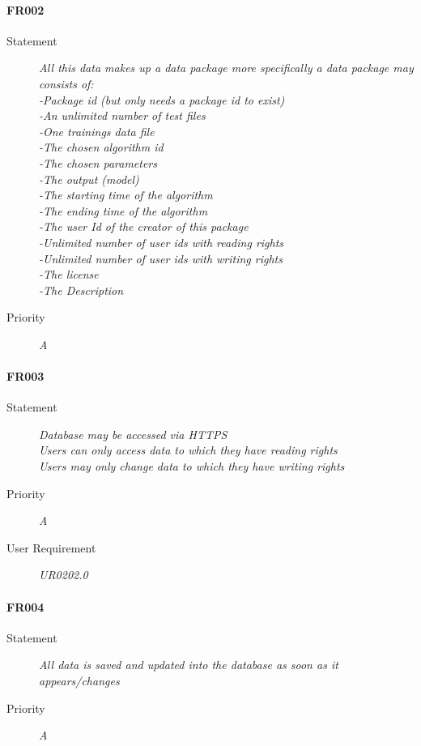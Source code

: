 \paragraph{FR002}
\begin{description}
\item [Statement] \textit{
 All this data makes up a data package more specifically a data package may consists of:  
	\\-Package id (but only needs a package id to exist)
	\\-An unlimited number of test files
	\\-One trainings data file
	\\-The chosen algorithm id
	\\-The chosen parameters
	\\-The output (model)
	\\-The starting time of the algorithm
	\\-The ending time of the algorithm
	\\-The user Id of the creator of this package
	\\-Unlimited number of user ids with reading rights
	\\-Unlimited number of user ids with writing rights
	\\-The license
	\\-The Description
}
\item [Priority] \textit{A}
\end{description}

\paragraph{FR003}
\begin{description}
\item [Statement] \textit{
Database may be accessed via \gls{HTTPS}  
	\\Users can only access data to which they have reading rights
	\\Users may only change data to which they have writing rights
}
\item [Priority] \textit{A}
\item[User Requirement] \textit{UR0202.0}
\end{description}

\paragraph{FR004}
\begin{description}
\item [Statement] \textit{
All data is saved and updated into the database as soon as it appears/changes
}
\item [Priority] \textit{A}
\end{description}

